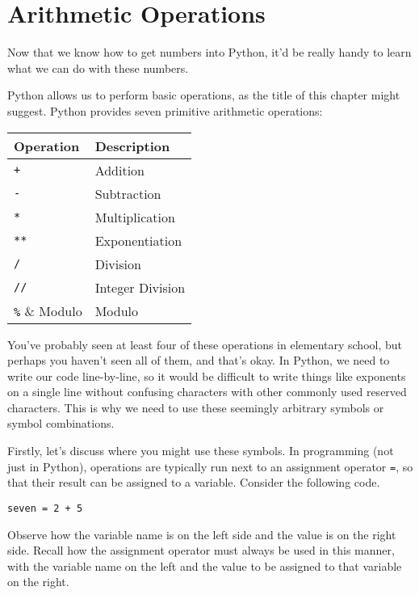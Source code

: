 \section{Arithmetic Operations}
Now that we know how to get numbers into Python, it'd be really handy to learn what we can do with these numbers.\par
Python allows us to perform basic  operations, as the title of this chapter might suggest. Python provides seven primitive arithmetic operations:\par
\vspace{5mm}
\begin{tabular}{|l|l|}
\hline
Operation & Description      \\
\hline
\verb|+|  & Addition         \\
\hline
\verb|-|  & Subtraction      \\
\hline
\verb|*|  & Multiplication   \\
\hline
\verb|**| & Exponentiation   \\
\hline
\verb|/|  & Division         \\
\hline
\verb|//| & Integer Division \\
\hline
\verb|%| & Modulo           \\
\hline
\end{tabular}\par
\vspace{5mm}
You've probably seen at least four of these operations in elementary school, but perhaps you haven't seen all of them, and that's okay. In Python, we need to write our code line-by-line, so it would be difficult to write things like exponents on a single line without confusing characters with other commonly used reserved characters. This is why we need to use these seemingly arbitrary symbols or symbol combinations.\par
Firstly, let's discuss where you might use these symbols. In programming (not just in Python),  operations are typically run next to an assignment operator \verb|=|, so that their result can be assigned to a variable. Consider the following code.
\begin{lstlisting}[style=pippython]
seven = 2 + 5
\end{lstlisting}
Observe how the variable name is on the left side and the value is on the right side. Recall how the assignment operator must always be used in this manner, with the variable name on the left and the value to be assigned to that variable on the right.\par
